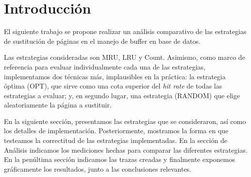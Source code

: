 \section{Introducci\'on}

El siguiente trabajo se propone realizar un an\'alisis comparativo de las estrategias de sustituci\'on de p\'aginas en el manejo de buffer en base de datos. 

Las estrategias consideradas son MRU, LRU y Count. Asimismo, como marco de referencia para evaluar individualmente cada una de las estrategias, implementamos dos t\'ecnicas m\'as, implausibles en la pr\'actica: la estrategia \'optima (OPT), que sirve como una cota superior del \textit{hit rate} de todas las estrategias a evaluar; y, en segundo lugar, una estrategia (RANDOM) que elige aleatoriamente la p\'agina a sustituir.

En la siguiente secci\'on, presentamos las estrategias que se consideraron, as\'i como los detalles de implementaci\'on. Posteriormente, mostramos la forma en que testeamos la correctitud de las estrategias implementadas. En la secci\'on de An\'alisis indicamos los mediciones hechas para comparar las diferentes estrategias. En la pen\'ultima secci\'on indicamos las trazas creadas y finalmente exponemos gr\'aficamente los resultados, junto a las conclusiones relevantes.
